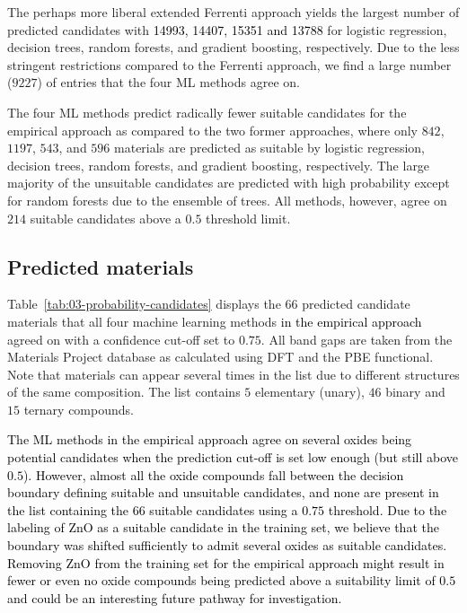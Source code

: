 \documentclass[superscriptaddress,unsortedaddress,
 amsmath,amssymb,
 aps,
]{revtex4-2}
\newcommand{\mrk}[1]{\textcolor{black}{#1}}
\begin{document}
The perhaps more liberal extended Ferrenti approach yields the largest number of predicted candidates with \mrk{\num{14993}, \num{14407}, \num{15351} and \num{13788}} for logistic regression, decision trees, random forests, and gradient boosting, respectively. Due to the less stringent restrictions compared to the Ferrenti approach, we find a large number ($9227$) of entries that the four ML methods  agree on.

The four ML methods predict radically fewer suitable candidates for the empirical approach as compared to the two former approaches, where only $842$, $1197$, $543$, and $596$ materials are predicted as suitable by logistic regression, decision trees, random forests, and gradient boosting, respectively. The large majority of the unsuitable candidates are predicted with high probability except for random forests due to the ensemble of trees. All methods, however, agree on $214$ suitable candidates above a $0.5$ threshold limit.  

\subsection*{Predicted materials}

Table~\ref{tab:03-probability-candidates} displays the $66$ predicted candidate materials that all four machine learning methods \mrk{in the empirical approach} agreed on with a confidence cut-off set to $0.75$. All band gaps are taken from the Materials Project database as calculated using DFT and the PBE functional. Note that materials can appear several times in the list due  to  different  structures of the same composition. The  list  contains $5$ elementary (unary), $46$ binary and  $15$ ternary compounds. 

\mrk{The ML methods in the empirical approach agree on several oxides being potential candidates when the prediction cut-off is set low enough (but still above $0.5$). However, almost all the oxide compounds fall between the decision boundary defining suitable and unsuitable candidates, and none are present in the list containing the $66$ suitable candidates using a $0.75$ threshold. Due to the labeling of ZnO as a suitable candidate in the training set, we believe that the boundary was shifted  sufficiently to admit several oxides as suitable candidates. Removing ZnO from the training set for the empirical approach might result in fewer or even no oxide compounds being predicted above a suitability limit of $0.5$ and could be an interesting future pathway for investigation.} 
\end{document}
